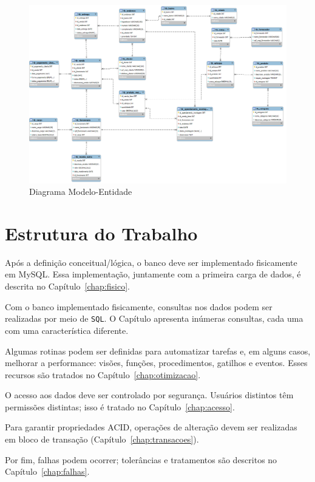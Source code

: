 \documentclass[
12pt,
a4paper,
semrecuonosumario,
sumario = abnt-6027-2012]{report}
\begin{document}
    \begin{figure}[H]
      \centering
      \includegraphics[width=.9\textwidth]{figuras/01-bdConceitualLog/mer.png}
      \caption{Diagrama Modelo-Entidade}
      \label{fig:mer}
    \end{figure}

    \section{Estrutura do Trabalho}\label{sec:EstruturaTrabalho}
    Após a definição conceitual/lógica, o banco deve ser implementado fisicamente em MySQL.
    Essa implementação, juntamente com a primeira carga de dados, é descrita no Capítulo~\ref{chap:fisico}.
    
    Com o banco implementado fisicamente, consultas nos dados podem ser realizadas por meio de \texttt{SQL}.
    O Capítulo apresenta inúmeras consultas, cada uma com uma característica diferente.
    
    Algumas rotinas podem ser definidas para automatizar tarefas e, em alguns casos, melhorar a performance:
    visões, funções, procedimentos, gatilhos e eventos. Esses recursos são tratados no Capítulo~\ref{chap:otimizacao}.
    
    O acesso aos dados deve ser controlado por segurança. Usuários distintos têm permissões distintas; isso é tratado no Capítulo~\ref{chap:acesso}.
    
    Para garantir propriedades ACID, operações de alteração devem ser realizadas em bloco de transação (Capítulo~\ref{chap:transacoes}).
    
    Por fim, falhas podem ocorrer; tolerâncias e tratamentos são descritos no Capítulo~\ref{chap:falhas}.
    
\end{document}
